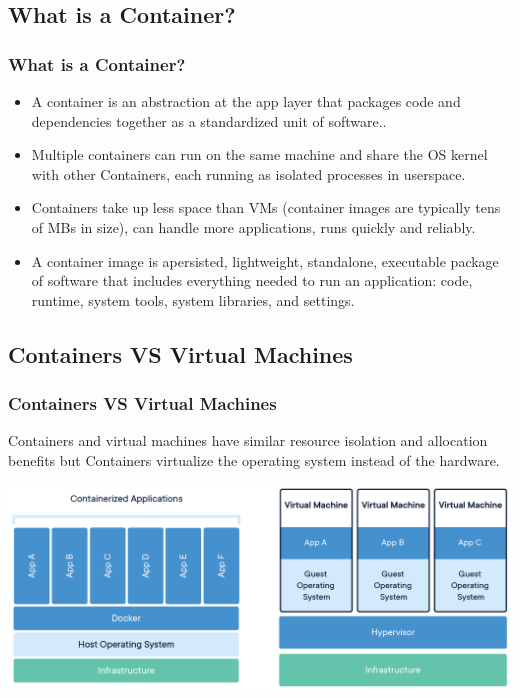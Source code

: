 \subsection{What is a Container?}
\begin{frame}
	\frametitle{What is a Container?}
	\begin{itemize}
		\item A container is an abstraction at the app layer that packages code and dependencies together as a standardized unit of software..
		\item Multiple containers can run on the same machine and share the OS kernel with other Containers, each running as isolated processes in userspace.
		\item Containers take up less space than VMs (container images are typically tens of MBs in size), can handle more applications, runs quickly and reliably.
		\item A container image is apersisted, lightweight, standalone, executable package of software that includes everything needed to run an application: code, runtime, system tools, system libraries, and settings.
	\end{itemize}
\end{frame}

\subsection{Containers VS Virtual Machines}
\begin{frame}
	\frametitle{Containers VS Virtual Machines}
	Containers and virtual machines have similar resource isolation and allocation benefits but Containers virtualize the operating system instead of the hardware.
	\linebreak
	
	\centering
	\includegraphics[width=\linewidth]{figures/docker-containerized-and-vm-transparent-bg.png}
\end{frame}

